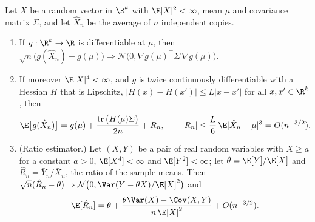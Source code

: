 \begin{proposition}\label{prop:mc-delta}
Let $X$ be a random vector in $\R^k$ with $\E|X|^2<\infty$, mean $\mu$ and covariance
matrix $\Sigma$, and let $\hat X_n$ be the average of $n$ independent copies.
\begin{enumerate}[label=(\roman*)]
  \item If $g:\R^k\to\R$ is differentiable at $\mu$, then
    $\sqrt n\big(g(\hat X_n)-g(\mu)\big)\Rightarrow\mathcal N\big(0,\nabla g(\mu)^\top\Sigma\,\nabla g(\mu)\big)$.
  \item If moreover $\E|X|^4<\infty$, and $g$ is twice continuously differentiable with a
    Hessian $H$ that is Lipschitz, $|H(x)-H(x')|\le L|x-x'|$ for all $x,x'\in\R^k$, then
    \[
      \E\big[g(\hat X_n)\big]=g(\mu)+\frac{\operatorname{tr}\big(H(\mu)\Sigma\big)}{2n}+R_n,\qquad
      |R_n|\le\frac L6\,\E|\hat X_n-\mu|^3=O(n^{-3/2}).
    \]
  \item (Ratio estimator.) Let $(X,Y)$ be a pair of real random variables with $X\ge a$ for
    a constant $a>0$, $\E[X^4]<\infty$ and $\E[Y^2]<\infty$; let $\theta=\E[Y]/\E[X]$ and
    $\hat R_n=\bar Y_n/\bar X_n$, the ratio of the sample means. Then
    $\sqrt n(\hat R_n-\theta)\Rightarrow\mathcal N\big(0,\Var(Y-\theta X)/\E[X]^2\big)$ and
    \[
      \E[\hat R_n]=\theta+\frac{\theta\Var(X)-\Cov(X,Y)}{n\,\E[X]^2}+O(n^{-3/2}).
    \]
\end{enumerate}
\end{proposition}

